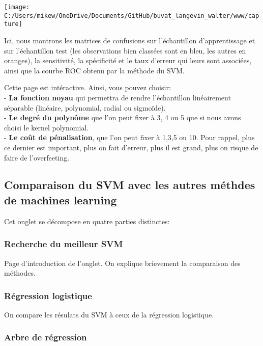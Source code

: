 \documentclass[]{article}
\begin{document}
\texttt{[image: C:/Users/mikew/OneDrive/Documents/GitHub/buvat\_langevin\_walter/www/capture]}

Ici, nous montrons les matrices de confusions sur l'échantillon
d'apprentissage et sur l'échantillon test (les observations bien
classées sont en bleu, les autres en oranges), la sensitivité, la
spécificité et le taux d'erreur qui leurs sont associées, ainsi que la
courbe ROC obtenu par la méthode du SVM.

Cette page est intéractive. Ainsi, vous pouvez choisir:\\
- \textbf{La fonction noyau} qui permettra de rendre l'échantillon
linéairement séparable (linéaire, polynomial, radial ou sigmoïde).\\
- \textbf{Le degré du polynôme} que l'on peut fixer à 3, 4 ou 5 que si
nous avons choisi le kernel polynomial.\\
- \textbf{Le coût de pénalisation}, que l'on peut fixer à 1,3,5 ou 10.
Pour rappel, plus ce dernier est important, plus on fait d'erreur, plus
il est grand, plus on risque de faire de l'overfeeting.

\hypertarget{comparaison-du-svm-avec-les-autres-muxe9thdes-de-machines-learning}{%
\subsection{Comparaison du SVM avec les autres méthdes de machines
learning}\label{comparaison-du-svm-avec-les-autres-muxe9thdes-de-machines-learning}}

Cet onglet se décompose en quatre parties distinctes:

\hypertarget{recherche-du-meilleur-svm}{%
\subsubsection{Recherche du meilleur
SVM}\label{recherche-du-meilleur-svm}}

Page d'introduction de l'onglet. On explique brievement la comparaison
des méthodes.

\hypertarget{ruxe9gression-logistique}{%
\subsubsection{Régression logistique}\label{ruxe9gression-logistique}}

On compare les résulats du SVM à ceux de la régression logistique.

\hypertarget{arbre-de-ruxe9gression}{%
\subsubsection{Arbre de régression}\label{arbre-de-ruxe9gression}}
\end{document}
